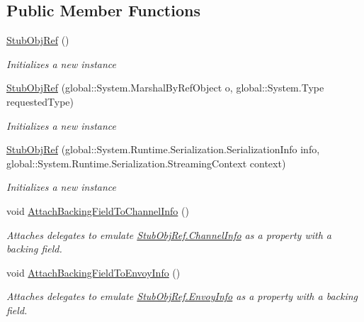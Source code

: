 \subsection*{Public Member Functions}
\begin{DoxyCompactItemize}
\item 
\hyperlink{class_system_1_1_runtime_1_1_remoting_1_1_fakes_1_1_stub_obj_ref_a36b5dba57adbbe2c90fdd6df21e42b21}{Stub\-Obj\-Ref} ()
\begin{DoxyCompactList}\small\item\em Initializes a new instance\end{DoxyCompactList}\item 
\hyperlink{class_system_1_1_runtime_1_1_remoting_1_1_fakes_1_1_stub_obj_ref_a03ec37fee23921ef31a2cd480f8f2ec8}{Stub\-Obj\-Ref} (global\-::\-System.\-Marshal\-By\-Ref\-Object o, global\-::\-System.\-Type requested\-Type)
\begin{DoxyCompactList}\small\item\em Initializes a new instance\end{DoxyCompactList}\item 
\hyperlink{class_system_1_1_runtime_1_1_remoting_1_1_fakes_1_1_stub_obj_ref_a449230eb20ea13323393fe0ac33b9502}{Stub\-Obj\-Ref} (global\-::\-System.\-Runtime.\-Serialization.\-Serialization\-Info info, global\-::\-System.\-Runtime.\-Serialization.\-Streaming\-Context context)
\begin{DoxyCompactList}\small\item\em Initializes a new instance\end{DoxyCompactList}\item 
void \hyperlink{class_system_1_1_runtime_1_1_remoting_1_1_fakes_1_1_stub_obj_ref_a011cd84698529ceed320436d158dd6fe}{Attach\-Backing\-Field\-To\-Channel\-Info} ()
\begin{DoxyCompactList}\small\item\em Attaches delegates to emulate \hyperlink{class_system_1_1_runtime_1_1_remoting_1_1_fakes_1_1_stub_obj_ref_a2a0cc723a5c24c70bb1d515568ef44f8}{Stub\-Obj\-Ref.\-Channel\-Info} as a property with a backing field.\end{DoxyCompactList}\item 
void \hyperlink{class_system_1_1_runtime_1_1_remoting_1_1_fakes_1_1_stub_obj_ref_aef02047ca7179cc6629f5655aa7af54c}{Attach\-Backing\-Field\-To\-Envoy\-Info} ()
\begin{DoxyCompactList}\small\item\em Attaches delegates to emulate \hyperlink{class_system_1_1_runtime_1_1_remoting_1_1_fakes_1_1_stub_obj_ref_a6b9da8d70ce66e8bb4f774c65b0eeee8}{Stub\-Obj\-Ref.\-Envoy\-Info} as a property with a backing field.\end{DoxyCompactList}\item 

\end{DoxyCompactItemize}

